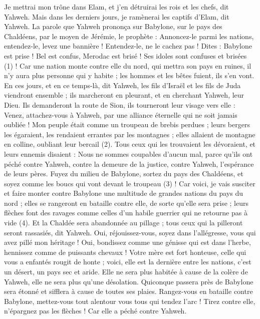 \begin{multicols}{2}
Je mettrai mon trône dans Elam, et j'en détruirai les rois et les chefs, dit Yahweh.
Mais dans les derniers jours, je ramènerai les captifs d'Elam, dit Yahweh.
\VerseOne{}La parole que Yahweh prononça sur Babylone, sur le pays des Chaldéens, par le moyen de Jérémie, le prophète :
Annoncez-le parmi les nations, entendez-le, levez une bannière ! Entendez-le, ne le cachez pas ! Dites : Babylone est prise ! Bel est confus, Merodac est brisé ! Ses idoles sont confuses et brisées\FTNT{} (1) !
Car une nation monte contre elle du nord, qui mettra son pays en ruines, il n'y aura plus personne qui y habite ; les hommes et les bêtes fuient, ils s'en vont.
En ces jours, et en ce temps-là, dit Yahweh, les fils d'Israël et les fils de Juda viendront ensemble ; ils marcheront en pleurant, et en cherchant Yahweh, leur Dieu.
Ils demanderont la route de Sion, ils tourneront leur visage vers elle : Venez, attachez-vous à Yahweh, par une alliance éternelle qui ne soit jamais oubliée !
Mon peuple était comme un troupeau de brebis perdues ; leurs bergers les égaraient, les rendaient errantes par les montagnes ; elles allaient de montagne en colline, oubliant leur bercail\FTNT{} (2).
Tous ceux qui les trouvaient les dévoraient, et leurs ennemis disaient : Nous ne sommes coupables d'aucun mal, parce qu'ils ont péché contre Yahweh, contre la demeure de la justice, contre Yahweh, l'espérance de leurs pères.
Fuyez du milieu de Babylone, sortez du pays des Chaldéens, et soyez comme les boucs qui vont devant le troupeau\FTNT{} (3) !
Car voici, je vais susciter et faire monter contre Babylone une multitude de grandes nations du pays du nord ; elles se rangeront en bataille contre elle, de sorte qu'elle sera prise ; leurs flèches font des ravages comme celles d'un habile guerrier qui ne retourne pas à vide\FTNT{} (4).
Et la Chaldée sera abandonnée au pillage ; tous ceux qui la pilleront seront rassasiés, dit Yahweh.
Oui, réjouissez-vous, soyez dans l'allégresse, vous qui avez pillé mon héritage ! Oui, bondissez comme une génisse qui est dans l'herbe, hennissez comme de puissants chevaux !
Votre mère est fort honteuse, celle qui vous a enfantés rougit de honte ; voici, elle est la dernière entre les nations, c'est un désert, un pays sec et aride.
Elle ne sera plus habitée à cause de la colère de Yahweh, elle ne sera plus qu'une désolation. Quiconque passera près de Babylone sera étonné et sifflera à cause de toutes ses plaies.
Rangez-vous en bataille contre Babylone, mettez-vous tout alentour vous tous qui tendez l'arc ! Tirez contre elle, n'épargnez pas les flèches ! Car elle a péché contre Yahweh.

\end{multicols}

